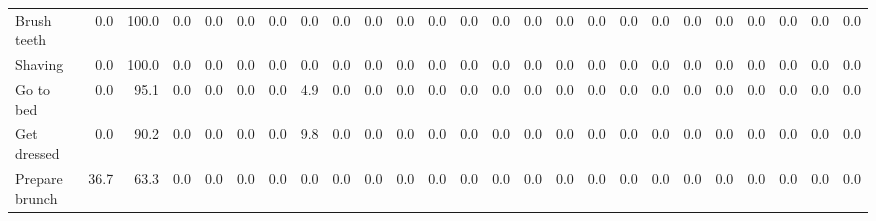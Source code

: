 \documentclass{article}
\begin{document}
\begin{sideways}
\begin{tabular}{lrrrrrrrrrrrrrrrrrrrrrrrr}
Brush teeth             &         0.0 &                    100.0 &               0.0 &                0.0 &                0.0 &            0.0 &              0.0 &                0.0 &                   0.0 &                   0.0 &                0.0 &                0.0 &                    0.0 &               0.0 &               0.0 &              0.0 &                   0.0 &             0.0 &                          0.0 &                 0.0 &               0.0 &                        0.0 &                        0.0 &                            0.0 \\
Shaving                 &         0.0 &                    100.0 &               0.0 &                0.0 &                0.0 &            0.0 &              0.0 &                0.0 &                   0.0 &                   0.0 &                0.0 &                0.0 &                    0.0 &               0.0 &               0.0 &              0.0 &                   0.0 &             0.0 &                          0.0 &                 0.0 &               0.0 &                        0.0 &                        0.0 &                            0.0 \\
Go to bed               &         0.0 &                     95.1 &               0.0 &                0.0 &                0.0 &            0.0 &              4.9 &                0.0 &                   0.0 &                   0.0 &                0.0 &                0.0 &                    0.0 &               0.0 &               0.0 &              0.0 &                   0.0 &             0.0 &                          0.0 &                 0.0 &               0.0 &                        0.0 &                        0.0 &                            0.0 \\
Get dressed             &         0.0 &                     90.2 &               0.0 &                0.0 &                0.0 &            0.0 &              9.8 &                0.0 &                   0.0 &                   0.0 &                0.0 &                0.0 &                    0.0 &               0.0 &               0.0 &              0.0 &                   0.0 &             0.0 &                          0.0 &                 0.0 &               0.0 &                        0.0 &                        0.0 &                            0.0 \\
Prepare brunch          &        36.7 &                     63.3 &               0.0 &                0.0 &                0.0 &            0.0 &              0.0 &                0.0 &                   0.0 &                   0.0 &                0.0 &                0.0 &                    0.0 &               0.0 &               0.0 &              0.0 &                   0.0 &             0.0 &                          0.0 &                 0.0 &               0.0 &                        0.0 &                        0.0 &                            0.0 \\

\end{tabular}
\end{sideways}
\end{document}
